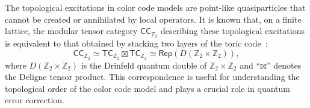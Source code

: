 \documentclass[a4paper,11pt]{article}
\newcommand{\Zbb}{\mathbb{Z}}
\theoremstyle{definition}
\theoremstyle{remark}
\theoremstyle{remark}
\newcommand\Rep {\mathsf{Rep}}
\begin{document}
The topological excitations in color code models are point-like quasiparticles that cannot be created or annihilated by local operators. 
It is known that, on a finite lattice, the modular tensor category $\mathsf{CC}_{\Zbb_2}$ describing these topological excitations 
is equivalent to that obtained by stacking two layers of the toric code~\cite{bombin2012universal,Kubica2015ColorCode,Kesselring2018boundaries,kesselring2024anyon}:
\begin{equation*}
    \mathsf{CC}_{\Zbb_2} \simeq \mathsf{TC}_{\Zbb_2} \boxtimes  \mathsf{TC}_{\Zbb_2} \simeq \Rep(D(\Zbb_2\times \Zbb_2)),
\end{equation*}
where $D(\Zbb_2\times \Zbb_2)$ is the Drinfeld quantum double of $\Zbb_2\times \Zbb_2$ and ``$\boxtimes$'' denotes the Deligne tensor product.
This correspondence is useful for understanding the topological order of the color code model and plays a crucial role in quantum error correction.



\begin{table}[h!]
\centering
{}
\caption{Topological excitations of the color code and their topological spins.}
\label{tab:colorcode_anyons_row}
\end{table}
\end{document}
